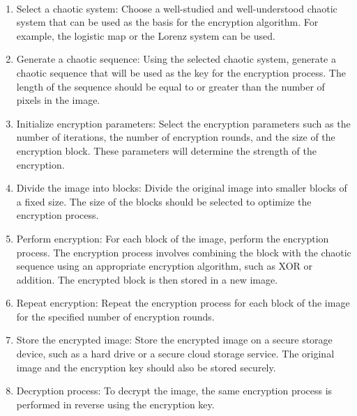 \documentclass[11pt,a4paper,english]{article}
\begin{document}
\paragraph{}
\begin{enumerate}
    \item Select a chaotic system: Choose a well-studied and well-understood chaotic system that can be used as the basis for the encryption algorithm. For example, the logistic map or the Lorenz system can be used.

    \item Generate a chaotic sequence: Using the selected chaotic system, generate a chaotic sequence that will be used as the key for the encryption process. The length of the sequence should be equal to or greater than the number of pixels in the image.

    \item Initialize encryption parameters: Select the encryption parameters such as the number of iterations, the number of encryption rounds, and the size of the encryption block. These parameters will determine the strength of the encryption.

    \item Divide the image into blocks: Divide the original image into smaller blocks of a fixed size. The size of the blocks should be selected to optimize the encryption process.

    \item Perform encryption: For each block of the image, perform the encryption process. The encryption process involves combining the block with the chaotic sequence using an appropriate encryption algorithm, such as XOR or addition. The encrypted block is then stored in a new image.

    \item Repeat encryption: Repeat the encryption process for each block of the image for the specified number of encryption rounds.

    \item Store the encrypted image: Store the encrypted image on a secure storage device, such as a hard drive or a secure cloud storage service. The original image and the encryption key should also be stored securely.

    \item Decryption process: To decrypt the image, the same encryption process is performed in reverse using the encryption key.
\end{enumerate}
\newpage
\end{document}

